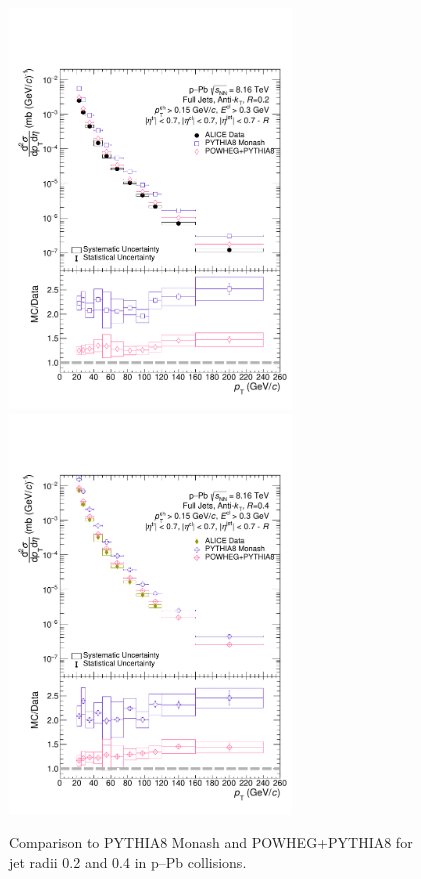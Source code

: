 \documentclass[ALICE]{ALICE_analysis_notes}
\newcommand{\pPb}{{\mbox{p--Pb}}\xspace}
\begin{document}
\begin{figure}
    \centering
    \begin{multicols}{2}
            \includegraphics[width=7.5cm]{figures/pPbFigures/MCGen/MCComp_R02_nooutlier.pdf}
        \vfill\null
        \columnbreak
            \includegraphics[width=7.5cm]{figures/pPbFigures/MCGen/MCComp_R04_nooutlier.pdf}
        \vfill\null
    \end{multicols}
    \caption{Comparison to PYTHIA8 Monash and POWHEG+PYTHIA8 for jet radii 0.2 and 0.4 in \pPb collisions.}
    \label{fig:MCGen_pPb}
\end{figure}
\end{document}
